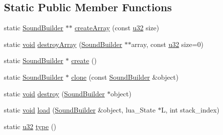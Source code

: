 \subsection*{Static Public Member Functions}
\begin{DoxyCompactItemize}
\item 
static \mbox{\hyperlink{classnjli_1_1_sound_builder}{Sound\+Builder}} $\ast$$\ast$ \mbox{\hyperlink{classnjli_1_1_sound_builder_aa467d7463364f288e2112b4dc49842c5}{create\+Array}} (const \mbox{\hyperlink{_util_8h_a10e94b422ef0c20dcdec20d31a1f5049}{u32}} size)
\item 
static \mbox{\hyperlink{_thread_8h_af1e856da2e658414cb2456cb6f7ebc66}{void}} \mbox{\hyperlink{classnjli_1_1_sound_builder_ab7d9d7b0f1239801eb2b4822326a5e0a}{destroy\+Array}} (\mbox{\hyperlink{classnjli_1_1_sound_builder}{Sound\+Builder}} $\ast$$\ast$array, const \mbox{\hyperlink{_util_8h_a10e94b422ef0c20dcdec20d31a1f5049}{u32}} size=0)
\item 
static \mbox{\hyperlink{classnjli_1_1_sound_builder}{Sound\+Builder}} $\ast$ \mbox{\hyperlink{classnjli_1_1_sound_builder_ac8f14144f6c578259789d003647e006c}{create}} ()
\item 
static \mbox{\hyperlink{classnjli_1_1_sound_builder}{Sound\+Builder}} $\ast$ \mbox{\hyperlink{classnjli_1_1_sound_builder_a99b6adfe180d217ad5076f53dce2462a}{clone}} (const \mbox{\hyperlink{classnjli_1_1_sound_builder}{Sound\+Builder}} \&object)
\item 
static \mbox{\hyperlink{_thread_8h_af1e856da2e658414cb2456cb6f7ebc66}{void}} \mbox{\hyperlink{classnjli_1_1_sound_builder_abdaa0b9dc2013c0ea003a113c510667e}{destroy}} (\mbox{\hyperlink{classnjli_1_1_sound_builder}{Sound\+Builder}} $\ast$object)
\item 
static \mbox{\hyperlink{_thread_8h_af1e856da2e658414cb2456cb6f7ebc66}{void}} \mbox{\hyperlink{classnjli_1_1_sound_builder_a082deb7455a25765004e778baae296b1}{load}} (\mbox{\hyperlink{classnjli_1_1_sound_builder}{Sound\+Builder}} \&object, lua\+\_\+\+State $\ast$L, int stack\+\_\+index)
\item 
static \mbox{\hyperlink{_util_8h_a10e94b422ef0c20dcdec20d31a1f5049}{u32}} \mbox{\hyperlink{classnjli_1_1_sound_builder_ae0834b181129d3880db67232fa56580a}{type}} ()
\end{DoxyCompactItemize}
